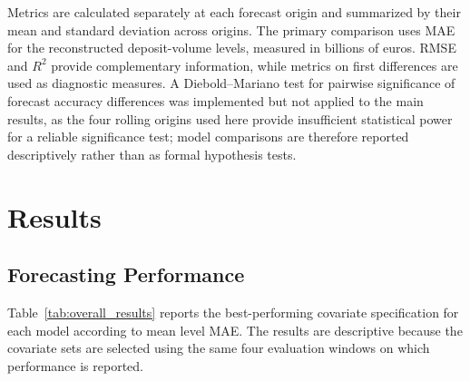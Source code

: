 \documentclass[11pt,a4paper]{article}
\begin{document}
Metrics are calculated separately at each forecast origin and summarized by
their mean and standard deviation across origins. The primary comparison uses
MAE for the reconstructed deposit-volume levels, measured in billions of
euros. RMSE and \(R^2\) provide complementary information, while metrics on
first differences are used as diagnostic measures.
A Diebold--Mariano test
for pairwise significance of forecast accuracy differences was implemented
but not applied to the main results, as the four rolling origins used here
provide insufficient statistical power for a reliable significance test;
model comparisons are therefore reported descriptively rather than as
formal hypothesis tests.





\section{Results}
\label{sec:results}

\subsection{Forecasting Performance}

Table~\ref{tab:overall_results} reports the best-performing covariate
specification for each model according to mean level MAE. The results are
descriptive because the covariate sets are selected using the same four
evaluation windows on which performance is reported.
\end{document}
